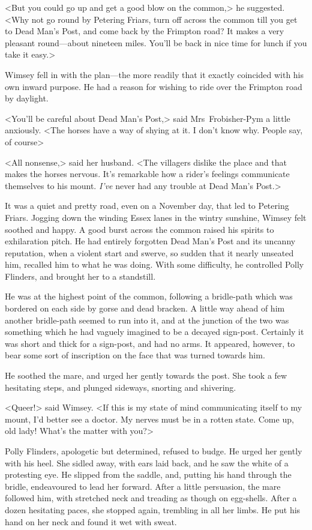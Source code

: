 <But you could go up and get a good blow on the common,> he suggested. <Why not go round by Petering Friars, turn off across the common till you get to Dead Man's Post, and come back by the Frimpton road? It makes a very pleasant round—about nineteen miles. You'll be back in nice time for lunch if you take it easy.>

Wimsey fell in with the plan—the more readily that it exactly coincided with his own inward purpose. He had a reason for wishing to ride over the Frimpton road by daylight.

<You'll be careful about Dead Man's Post,> said Mrs~Frobisher-Pym a little anxiously. <The horses have a way of shying at it. I don't know why. People say, of course\longdash>

<All nonsense,> said her husband. <The villagers dislike the place and that makes the horses nervous. It's remarkable how a rider's feelings communicate themselves to his mount. \textit{I've} never had any trouble at Dead Man's Post.>

It was a quiet and pretty road, even on a November day, that led to Petering Friars. Jogging down the winding Essex lanes in the wintry sunshine, Wimsey felt soothed and happy. A good burst across the common raised his spirits to exhilaration pitch. He had entirely forgotten Dead Man's Post and its uncanny reputation, when a violent start and swerve, so sudden that it nearly unseated him, recalled him to what he was doing. With some difficulty, he controlled Polly Flinders, and brought her to a standstill.

He was at the highest point of the common, following a bridle-path which was bordered on each side by gorse and dead bracken. A little way ahead of him another bridle-path seemed to run into it, and at the junction of the two was something which he had vaguely imagined to be a decayed sign-post. Certainly it was short and thick for a sign-post, and had no arms. It appeared, however, to bear some sort of inscription on the face that was turned towards him.

He soothed the mare, and urged her gently towards the post. She took a few hesitating steps, and plunged sideways, snorting and shivering.

<Queer!> said Wimsey. <If this is my state of mind communicating itself to my mount, I'd better see a doctor. My nerves must be in a rotten state. Come up, old lady! What's the matter with you?>

Polly Flinders, apologetic but determined, refused to budge. He urged her gently with his heel. She sidled away, with ears laid back, and he saw the white of a protesting eye. He slipped from the saddle, and, putting his hand through the bridle, endeavoured to lead her forward. After a little persuasion, the mare followed him, with stretched neck and treading as though on egg-shells. After a dozen hesitating paces, she stopped again, trembling in all her limbs. He put his hand on her neck and found it wet with sweat.

